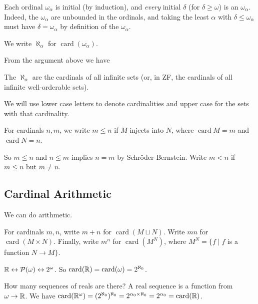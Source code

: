 \documentclass[a4paper, 10pt, twocolumn]{amsart}
\newcommand{\card}{\operatorname{card}}
\begin{document}
Each ordinal $\omega_\alpha$ is initial (by induction), and \emph{every} initial $\delta$ (for $\delta \geq \omega$) is an $\omega_\alpha$. 
Indeed, the $\omega_\alpha$ are unbounded in the ordinals, and taking the least $\alpha$ with $\delta \leq \omega_\alpha$ must have $\delta = \omega_\alpha$ by definition of the $\omega_\alpha$.

\begin{definition}
  We write $\aleph_\alpha$ for $\card(\omega_\alpha)$.
\end{definition}

From the argument above we have

\begin{theorem}
  The $\aleph_\alpha$ are the cardinals of all infinite sets (or, in ZF, the cardinals of all infinite well-orderable sets).
\end{theorem}

We will use lower case letters to denote cardinalities and upper case for the sets with that cardinality.

\begin{definition}
  For cardinals $n, m$, we write $m \leq n$ if $M$ injects into $N$, where $\card M = m$ and $\card N = n$. 

  So $m \leq n$ and $n \leq m$ implies $n = m$ by Schr\"oder-Bernstein. Write $m < n$ if $m \leq n$ but $m \neq n$.
\end{definition}

\subsection{Cardinal Arithmetic}

We can do arithmetic.


\begin{definition}
  For cardinals $m, n$, write $m +n$ for $\card(M \sqcup N)$. Write $mn$ for $\card(M \times N)$. Finally, write $m^n$ for $\card(M^N)$, where $M^N = \{f \mid f$ is a function $N \rightarrow M\}$.
\end{definition}

\begin{example}
  $\mathbb{R} \leftrightarrow \mathcal{P}(\omega) \leftrightarrow 2^\omega$.
  So $\card(\R) = \card(\mathcal{\omega}) = 2^{\aleph_0}$.
\end{example}

\begin{example}
  How many sequences of reals are there? A real sequence is a function from $\omega \rightarrow \mathbb{R}$. We have $\card(\R^\omega) = (2^{\aleph_0})^{\aleph_0} = 2^{\alpha_0 \times \aleph_0} = 2^{\alpha_0} = \card(\R)$.
\end{example}
\end{document}

